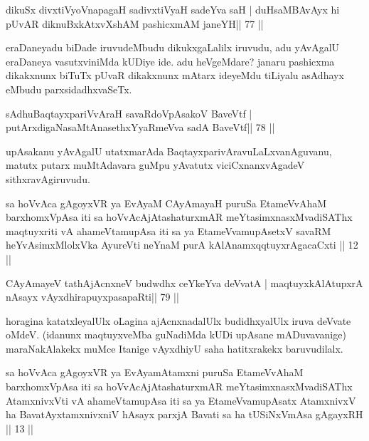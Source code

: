 \begin{shl}
dikuSx divxtiVyoV\s napagaH sadivxtiVyaH sadeYva saH |
duHsaMBAvAyx hi pUvAR diknuBxkAtxvX\s\s shAM pashicxmAM janeYH\hfill || 77 ||
\end{shl}

\begin{artha}
eraDaneyadu biDade iruvudeMbudu dikukxgaLalilx iruvudu, adu yAvAgalU eraDaneya vasutxviniMda kUDiye ide. adu heVgeMdare? janaru pashicxma dikakxnunx biTuTx pUvaR dikakxnunx mAtarx ideyeMdu tiLiyalu asAdhayx eMbudu parxsidadhxvaSeTx.
\end{artha}


\begin{shl}
sAdhuBaqtayxpariVvAraH savaRdoVpAsakoV BaveVtf |
putArxdigaNasaMtAnasethxYyaRmeVva sadA BaveVtf\hfill || 78 ||
\end{shl}

\begin{artha}
upAsakanu yAvAgalU utatxmarAda BaqtayxparivAravuLaLxvanAguvanu, matutx putarx muMtAdavara guMpu yAvatutx viciCxnanxvAgadeV sithxravAgiruvudu.
\end{artha} 


\begin{kandikeshl}
sa hoVvAca gAgoyxVR ya EvAyaM CAyAmayaH puruSa EtameVvAhaM barxhomxVpAsa iti sa hoVvAcAjAtashaturxmAR meYtasimxnasxMvadiSAThx maqtuyxriti vA ahameVtamupAsa iti sa ya EtameVvamupAsetxV savaRM heYvAsimxMlolxVka AyureVti neYnaM purA kAlAnamxqqtuyxrAgacaCxti || 12 ||
\end{kandikeshl}


\begin{shl}
CAyAmayeV tathA\s jAcnxneV budwdhx ceYkeYva deVvatA |
maqtuyxkAlAtupxrA nAsayx vAyxdhirapuyxpasapaRti\hfill || 79 ||
\end{shl}

\begin{artha}
horagina katatxleyalUlx oLagina ajAcnxnadalUlx budidhxyalUlx iruva  deVvate oMdeV. (idanunx maqtuyxveMba guNadiMda kUDi upAsane mADuvavanige) maraNakAlakekx muMce Itanige vAyxdhiyU saha hatitxrakekx baruvudilalx.
\end{artha}


\begin{kandikeshl}
sa hoVvAca gAgoyxVR ya EvAyamAtamxni puruSa EtameVvAhaM barxhomxVpAsa iti sa hoVvAcAjAtashaturxmAR meYtasimxnasxMvadiSAThx AtamxnivxVti vA ahameVtamupAsa iti sa ya EtameVvamupAsatx AtamxnivxV ha BavatAyxtamxnivxniV hAsayx parxjA Bavati sa ha tUSiNxVmAsa gAgayxRH || 13 ||
\end{kandikeshl}

